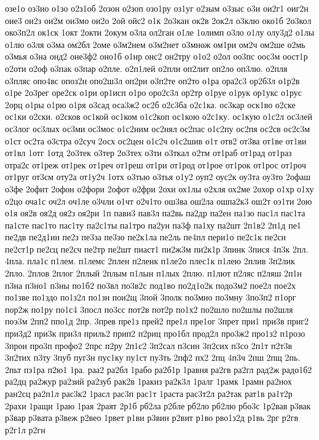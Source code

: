 {озе1о
оз3но
о1зо
о2з1об
2озон
о2зоп
озо1ру
оз1уг
о2зым
о3зыс
о3и
ои2г1
оиг2н
оие3
ои2з
ои2м
ои3мо
ои2о
2ой
ойс2
о1к
2о3кан
ок2в
2ок2л
о3клю
око1б
2о3кол
око3п2л
ок1ск
1окт
2окти
2окум
о3ла
ол2ган
о1ле
1олимп
о3ло
о1лу
олу3д2
о1лы
о1лю
о3ля
о3ма
ом2бл
2оме
о3м2нем
о3м2нет
о3множ
ом1ри
ом2ч
ом2ше
о2мь
о3мья
о3на
онд2
оне3ф2
оно1б
о1нр
онс2
он2тру
о1о2
о2ол
оо3пс
оос3м
оост1р
о2оти
о2оф
о3пак
о3пар
о2пле.
о2п1лей
о2пли
оп2лит
оп2ло
оп3лю.
о2пля
о3пляс
опо4вс
опоз2н
опо2ш3л
оп2ри
о3п2те
оп2то
о1ра
ора2с3
ор2б3л
о1р2в
о1ре
2о3рег
оре2ск
о1ри
ор1исп
о1ро
оро2с3л
ор2тр
о1руе
о1рук
ор1укс
о1рус
2орц
о1ры
о1рю
о1ря
о3сад
оса3ж2
ос2б
о2с3ба
о2с1ка.
ос3кар
оск1во
о2ске
ос1ки
о2ски.
о2сков
ос1кой
ос1ком
о1с2коп
ос1кою
о2с1ку.
ос1кую
о1с2л
ос3лей
ос3лог
ос3лых
ос3ми
ос3мос
о1с2ним
ос2нял
ос2пас
о1с2пу
ос2пя
ос2св
ос2с3м
о1ст
ос2та
о3стра
о2суч
2осх
ос2цен
о1с2ч
о1с2шив
о1т
отв2
от3ва
от1ве
от1ви
от1вл
1отг
1отд
2о3тек
о3тер
2о3тех
о3ти
о3ткал
о2тм
от1раб
от1рад
от1раз
отра2с
от1реж
от1рек
от1реч
от1реш
от1ри
от1род
от1рое
от1рок
от1рос
от1роч
от1руг
от3см
оту2а
от1у2ч
1отх
о3тью
о3тья
о1у2
оуп2
оус2к
оу3та
оу3то
2офаш
о3фе
2офит
2офон
о2фори
2офот
о2фри
2охи
ох1лы
о2хля
ох2ме
2охор
о1хр
о1ху
о2цо
оча1с
оч2л
оч1ле
о3чли
о1чт
о2ч1то
ош3ва
ош2ла
ошпа2к3
ош2т
оэ1ти
2ою
о1я
оя2в
оя2д
оя2з
оя2ри
1п
пави3
пав3л
па2вь
па2др
па2ен
па1зо
пас1л
пас1та
па1сте
пас1то
пас1ту
па2с1ты
па1тро
па2ун
па3ф
па1ху
па2шт
2п1в2
2п1д
пе1
пе2дв
пе2д1ин
пе2з
пе3за
пе3зо
пе2к1ла
пе2ль
пе4пл
пери1о
пе2с1к
пе2сн
пе2ст1р
пе2сц
пе2сч
пе2тр
пе2шт
пиаст1
пи2ж3м
пи2к1р
3пинк
3пися
4п3к
2пл.
4пла.
пла1с
п1лем.
п1лемс
2плен
п2ленк
п1ле2о
плес1к
п1лею
2плив
3п2лик
2пло.
2плов
2плог
2плый
2плым
п1лын
п1лых
2плю.
п1лют
п2ляс
п2ляш
2п1н
п3на
п3но1
п3ны
по1б2
по3вл
по3в2с
под1во
по2д1о2к
подо3м2
пое2л
пое2х
по1зве
по1здо
по1з2л
по1зн
пои2щ
3пой
3полк
по3мно
по3мну
3по3п2
п1орг
пор2ж
по1ру
по1с4
3посл
по3сс
пот2в
пот2р
по1х2
по2шло
по2шлы
по2шля
поэ3м
2пп2
ппо1д
2пр.
3прев
пре1з
прей2
пре1л
пре1ог
3прет
при1
при3в
приг2
при3д2
при3к
при3л
приль2
прип2
п2риц
про1бл
прод2л
про3ж2
про1з2
п1розо
3прои
про3п
профо2
2прс
п2ру
2п1с2
3п2сал
п3син
3п2сих
п3со
2п1т
п2т3в
3п2тих
п3ту
3пуб
пуг3н
пус1ку
пу1ст
пу3ть
2пф2
пх2
2пц
4п3ч
2пш
2пщ
2пь.
2пьт
пэ1ра
п2ю1
1ра.
раа2
ра2бл
1рабо
ра2б1р
1равня
ра2гв
ра2гл
рад2ж
радо1б2
ра2дц
ра2жур
ра2зий
ра2зуб
рак2в
1ракиз
ра2к3л
1ралг
1рамк
1рамн
ра2нох
ран2сц
ра2п1л
рас3к2
1расл
рас3п
рас1т
1раста
рас3т2л
ра2так
рат1в
ра1т2р
2рахи
1ращи
1раю
1рая
2раят
2р1б
рб2ла
р2бле
рб2ло
рб2лю
рбо3с
1р2вав
р3вак
р3вар
р3вата
р3веж
р2вео
1рвет
р1ви
р3вин
р2вит
р1во
рво1з2д
р1вь
2рг
р2гв
р2г1л
р2гн
}

